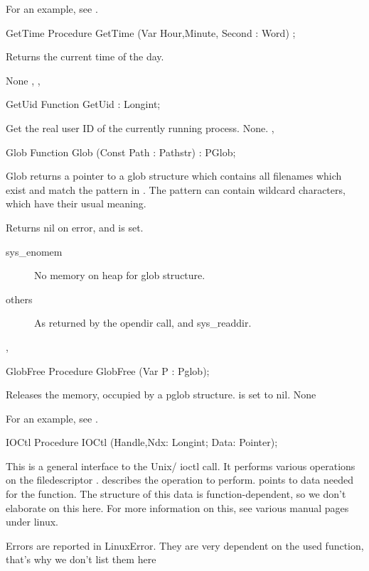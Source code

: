 For an example, see .
\begin{procedure}{GetTime}
\Declaration
Procedure GetTime  (Var Hour,Minute, Second : Word) ;

\Description

Returns the current time of the day.

\Errors
None
\SeeAlso
{}, ,  
\end{procedure}
\begin{function}{GetUid}
\Declaration
Function GetUid  : Longint;

\Description
 Get the real user ID of the currently running process.
\Errors
None.
\SeeAlso
{},  
\end{function}
\begin{function}{Glob}
\Declaration
Function Glob (Const Path : Pathstr) : PGlob;

\Description

Glob returns a pointer to a glob structure which contains all filenames which
exist and match the pattern in .
The pattern can contain wildcard characters, which have their
usual meaning.

\Errors
 Returns nil on error, and  is set.
\begin{description}
\item[sys\_enomem] No memory on heap for glob structure.
\item[others] As returned by the opendir call, and sys\_readdir.
\end{description}

\SeeAlso
{},  
\end{function}
\begin{procedure}{GlobFree}
\Declaration
Procedure GlobFree (Var P : Pglob);

\Description
Releases the memory, occupied by a pglob structure.  is set to nil.
\Errors
None
\SeeAlso
\end{procedure}
For an example, see .
\begin{procedure}{IOCtl}
\Declaration
Procedure IOCtl (Handle,Ndx: Longint; Data: Pointer);

\Description

This is a general interface to the Unix/ \linux ioctl call.
It performs various operations on the filedescriptor .
 describes the operation to perform.
 points to data needed for the  function. 
The structure of this data is function-dependent, so we don't elaborate on
this here. 
For more information on this, see various manual pages under linux.

\Errors

Errors are reported in LinuxError. They are very dependent on the used
function, that's why we don't list them here

\SeeAlso
{}
\end{procedure}
